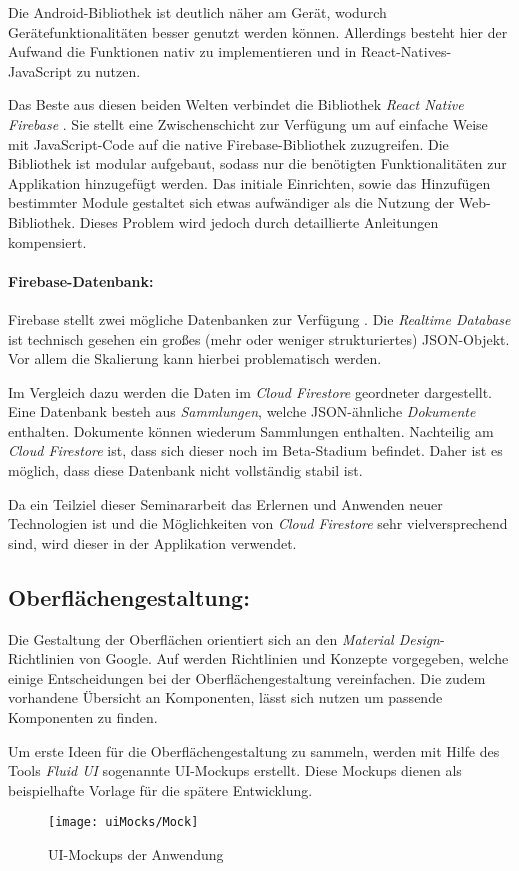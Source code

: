 Die Android-Bibliothek ist deutlich näher am Gerät, wodurch Gerätefunktionalitäten besser genutzt werden können.
Allerdings besteht hier der Aufwand die Funktionen nativ zu implementieren und in React-Natives-JavaScript zu nutzen.

Das Beste aus diesen beiden Welten verbindet die Bibliothek \textit{React Native Firebase} \cite{invertas78:online}.
Sie stellt eine Zwischenschicht zur Verfügung um auf einfache Weise mit JavaScript-Code auf die native Firebase-Bibliothek zuzugreifen.
Die Bibliothek ist modular aufgebaut, sodass nur die benötigten Funktionalitäten zur Applikation hinzugefügt werden.
Das initiale Einrichten, sowie das Hinzufügen bestimmter Module gestaltet sich etwas aufwändiger als die Nutzung der Web-Bibliothek.
Dieses Problem wird jedoch durch detaillierte Anleitungen kompensiert.

\paragraph{Firebase-Datenbank:}
Firebase stellt zwei mögliche Datenbanken zur Verfügung \cite{ChooseaD77:online}.
Die \textit{Realtime Database} ist technisch gesehen ein großes (mehr oder weniger strukturiertes) JSON-Objekt.
Vor allem die Skalierung kann hierbei problematisch werden.

Im Vergleich dazu werden die Daten im \textit{Cloud Firestore} geordneter dargestellt.
Eine Datenbank besteh aus \textit{Sammlungen}, welche JSON-ähnliche \textit{Dokumente} enthalten.
Dokumente können wiederum Sammlungen enthalten.
Nachteilig am \textit{Cloud Firestore} ist, dass sich dieser noch im Beta-Stadium befindet.
Daher ist es möglich, dass diese Datenbank nicht vollständig stabil ist.

Da ein Teilziel dieser Seminararbeit das Erlernen und Anwenden neuer Technologien ist und die Möglichkeiten von \textit{Cloud Firestore} sehr vielversprechend sind,
wird dieser in der Applikation verwendet.
\newpage
\subsection{Oberflächengestaltung:}
Die Gestaltung der Oberflächen orientiert sich an den \textit{Material Design}-\newline
Richtlinien von Google.
Auf \cite{DesignMa49:online} werden Richtlinien und Konzepte vorgegeben,
welche einige Entscheidungen bei der Oberflächengestaltung vereinfachen.
Die zudem vorhandene Übersicht an Komponenten, lässt sich nutzen um passende Komponenten zu finden.

Um erste Ideen für die Oberflächengestaltung zu sammeln,
werden mit Hilfe des Tools \textit{Fluid UI} \cite{FluidUIc8:online} sogenannte UI-Mockups erstellt.
Diese Mockups dienen als beispielhafte Vorlage für die spätere Entwicklung.


\begin{figure}[h]
    \centering
    \texttt{[image: uiMocks/Mock]}
    \caption{UI-Mockups der Anwendung}
\end{figure}
